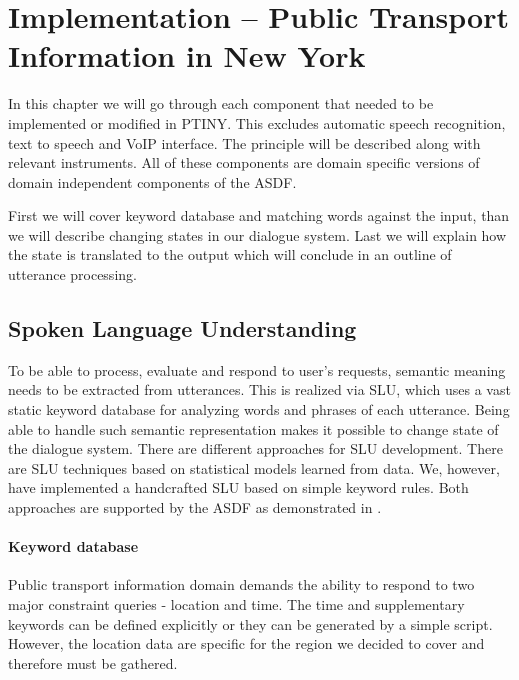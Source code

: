 \chapter{Implementation -- Public Transport Information in New York}

In this chapter we will go through each component that needed to be implemented or modified in \ac{PTINY}.
This excludes automatic speech recognition, text to speech and VoIP interface.
The principle will be described along with relevant instruments. %
All of these components are domain specific versions of domain independent components of the \ac{ASDF}.

First we will cover keyword database and matching words against the input, than we will describe changing states in our dialogue system.
Last we will explain how the state is translated to the output which will conclude in an outline of utterance processing. %

\section{Spoken Language Understanding}

To be able to process, evaluate and respond to user's requests, semantic meaning needs to be extracted from utterances. %
This is realized via \acf{SLU}, which uses a vast static keyword database for analyzing words and phrases of each utterance.
Being able to handle such semantic representation makes it possible to change state of the dialogue system.
There are different approaches for \ac{SLU} development.
There are \ac{SLU} techniques based on statistical models learned from data.
We, however, have implemented a handcrafted \ac{SLU} based on simple keyword rules.
Both approaches are supported by the \ac{ASDF} as demonstrated in \cite{slu}.


\subsubsection{Keyword database} 

Public transport information domain demands the ability to respond to two major constraint queries - location and time.
The time and supplementary keywords can be defined explicitly or they can be generated by a simple script.
However, the location data are specific for the region we decided to cover and therefore must be gathered.

